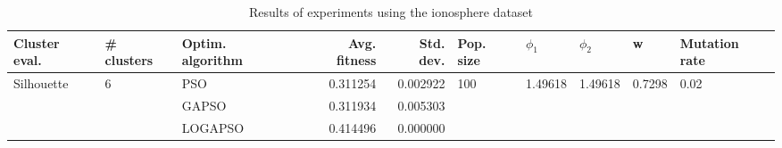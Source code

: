 \begin{table}
\centering
\caption{Results of experiments using the ionosphere dataset}
\begin{tabular}{lllrrlllll}
\toprule
              Cluster eval. &        \# clusters & Optim. algorithm &  Avg. fitness &  Std. dev. &            Pop. size &               $\phi_{1}$ &               $\phi_{2}$ &                       w &         Mutation rate \\
\midrule
\multirow{3}{*}{Silhouette} & \multirow{3}{*}{6} &              PSO &      0.311254 &   0.002922 & \multirow{3}{*}{100} & \multirow{3}{*}{1.49618} & \multirow{3}{*}{1.49618} & \multirow{3}{*}{0.7298} & \multirow{3}{*}{0.02} \\
                            &                    &            GAPSO &      0.311934 &   0.005303 &                      &                          &                          &                         &                       \\
                            &                    &          LOGAPSO &      0.414496 &   0.000000 &                      &                          &                          &                         &                       \\
\bottomrule
\end{tabular}
\end{table}
